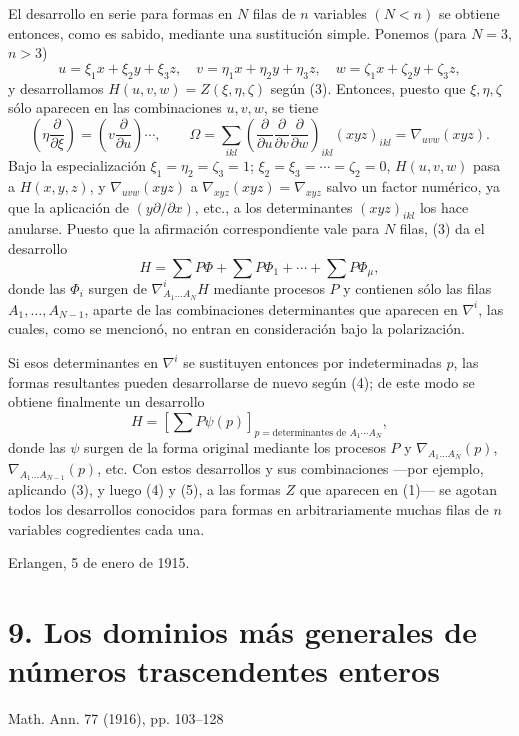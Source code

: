 \documentclass[11pt]{article}
\begin{document}
El desarrollo en serie para formas en $N$ filas de $n$ variables $(N<n)$ se obtiene entonces, como es sabido, mediante una sustitución simple. Ponemos (para $N=3$, $n>3$)
\[
  u=\xi_1x+\xi_2y+\xi_3z,
  \quad v=\eta_1x+\eta_2y+\eta_3z,
  \quad w=\zeta_1x+\zeta_2y+\zeta_3z,
\]
y desarrollamos $H(u,v,w)=Z(\xi,\eta,\zeta)$ según (3). Entonces, puesto que $\xi,\eta,\zeta$ sólo aparecen en las combinaciones $u,v,w$, se tiene
\[
  \left(\eta\frac{\partial}{\partial \xi}\right)=
  \left(v\frac{\partial}{\partial u}\right)\cdots,
  \qquad
  \Omega=\sum_{ikl}\left(\frac{\partial}{\partial u}
  \frac{\partial}{\partial v}
  \frac{\partial}{\partial w}\right)_{ikl}(xyz)_{ikl}
  =\nabla_{uvw}(xyz).
\]
Bajo la especialización $\xi_1=\eta_2=\zeta_3=1$; $\xi_2=\xi_3=\cdots=\zeta_2=0$, $H(u,v,w)$ pasa a $H(x,y,z)$, y $\nabla_{uvw}(xyz)$ a $\nabla_{xyz}(xyz)=\nabla_{xyz}$ salvo un factor numérico, ya que la aplicación de $(y\partial/\partial x)$, etc., a los determinantes $(xyz)_{ikl}$ los hace anularse. Puesto que la afirmación correspondiente vale para $N$ filas, (3) da el desarrollo
\begin{equation}
  H=\sum P\Phi+\sum P\Phi_1+\cdots+\sum P\Phi_\mu,
\tag{4}
\end{equation}
donde las $\Phi_i$ surgen de $\nabla^i_{A_1\ldots A_N}H$ mediante procesos $P$ y contienen sólo las filas $A_1,
\ldots,A_{N-1}$, aparte de las combinaciones determinantes que aparecen en $\nabla^i$, las cuales, como se mencionó, no entran en consideración bajo la polarización.

Si esos determinantes en $\nabla^i$ se sustituyen entonces por indeterminadas $p$, las formas resultantes pueden desarrollarse de nuevo según (4); de este modo se obtiene finalmente un desarrollo
\begin{equation}
  H=\left[\sum P\psi(p)\right]_{p=\text{determinantes de }A_1\cdots A_N},
\tag{5}
\end{equation}
donde las $\psi$ surgen de la forma original mediante los procesos $P$ y $\nabla_{A_1\ldots A_N}(p)$, $\nabla_{A_1\ldots A_{N-1}}(p)$, etc. Con estos desarrollos y sus combinaciones ---por ejemplo, aplicando (3), y luego (4) y (5), a las formas $Z$ que aparecen en (1)--- se agotan todos los desarrollos conocidos para formas en arbitrariamente muchas filas de $n$ variables cogredientes cada una.

Erlangen, 5 de enero de 1915.

\clearpage
\section*{9. Los dominios más generales de números trascendentes enteros}
\begin{center}
Math. Ann. 77 (1916), pp. 103--128
\end{center}
\end{document}
